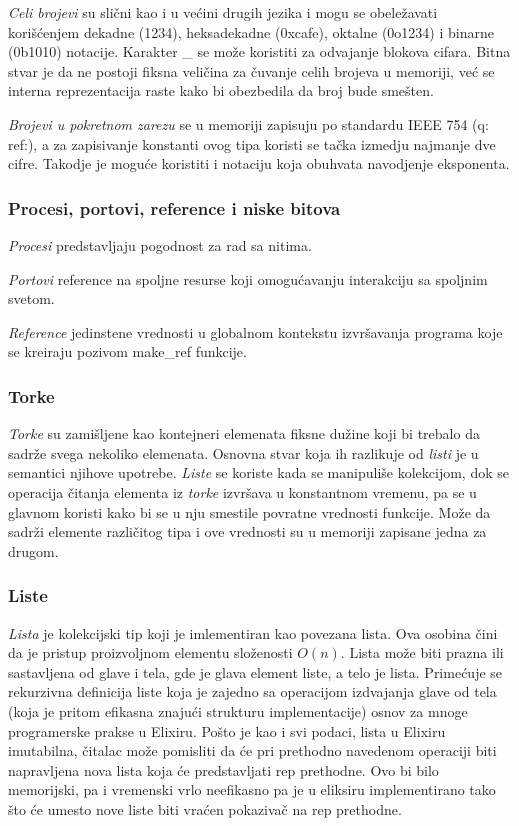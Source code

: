 \documentclass[a4paper]{article}
\begin{document}
\textit{Celi brojevi} su slični kao i u većini drugih jezika i mogu se obeležavati korišćenjem dekadne (1234), heksadekadne (0xcafe), oktalne (0o1234) i binarne (0b1010) notacije. Karakter \_ se može koristiti za odvajanje blokova cifara. Bitna stvar je da ne postoji fiksna veličina za čuvanje celih brojeva u memoriji, već se interna reprezentacija raste kako bi obezbedila da broj bude smešten.

\textit{Brojevi u pokretnom zarezu} se u memoriji zapisuju po standardu IEEE 754 (q: ref:), a za zapisivanje konstanti ovog tipa koristi se tačka izmedju najmanje dve cifre. Takodje je moguće koristiti i notaciju koja obuhvata navodjenje eksponenta.

\subsubsection{Procesi, portovi, reference i niske bitova}
\label{sec:ime}
\textit{Procesi} predstavljaju pogodnost za rad sa nitima.

\textit{Portovi} reference na spoljne resurse koji omogućavanju interakciju sa spoljnim svetom.

\textit{Reference} jedinstene vrednosti u globalnom kontekstu izvršavanja programa koje se kreiraju pozivom make\_ref funkcije.

\subsubsection{Torke}
\label{sec:ime}
\textit{Torke} su zamišljene kao kontejneri elemenata fiksne dužine koji bi trebalo da sadrže svega nekoliko elemenata. Osnovna stvar koja ih razlikuje od \textit{listi} je u semantici njihove upotrebe. \textit{Liste} se koriste kada se manipuliše kolekcijom, dok se operacija čitanja elementa iz \textit{torke} izvršava u konstantnom vremenu, pa se u glavnom koristi kako bi se u nju smestile povratne vrednosti funkcije. Može da sadrži elemente različitog tipa i ove vrednosti su u memoriji zapisane jedna za drugom.

\subsubsection{Liste}
\label{sec:ime}
\textit{Lista} je kolekcijski tip koji je imlementiran kao povezana lista. Ova osobina čini da je pristup proizvoljnom elementu složenosti \( O(n) \). Lista može biti prazna ili sastavljena od glave i tela, gde je glava element liste, a telo je lista. Primećuje se rekurzivna definicija liste koja je zajedno sa operacijom izdvajanja glave od tela (koja je pritom efikasna znajući strukturu implementacije) osnov za mnoge programerske prakse u Elixiru. Pošto je kao i svi podaci, lista u Elixiru imutabilna, čitalac može pomisliti da će pri prethodno navedenom operaciji biti napravljena nova lista koja će predstavljati rep prethodne. Ovo bi bilo memorijski, pa i vremenski vrlo neefikasno pa je u eliksiru implementirano tako što će umesto nove liste biti vraćen pokazivač na rep prethodne.
\end{document}
